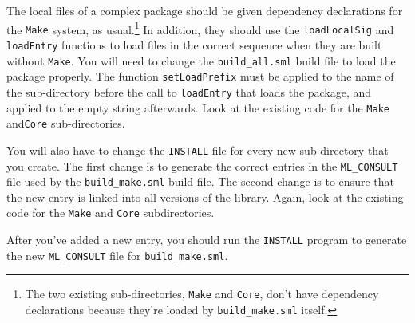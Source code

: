 The local files of a complex package should be given dependency declarations
for the {\tt Make} system, as usual.\footnote{The two existing sub-directories,
{\tt Make} and {\tt Core}, don't have dependency declarations because
they're loaded by {\tt build\_make.sml} itself.}
In addition, they should use the
{\tt loadLocalSig} and {\tt loadEntry} functions to load files in the correct
sequence when they are built without {\tt Make}.  You will need to change
the {\tt build\_all.sml}
build file to load the package properly.  The function {\tt setLoadPrefix}
must be applied to the name of the sub-directory before the call to
{\tt loadEntry} that loads the package, and applied to the empty string
afterwards.  Look at the existing code for the {\tt Make} and{\tt Core}
sub-directories.

You will also have to change the {\small\tt INSTALL} file for every
new sub-directory that you create.  The first change is to generate
the correct entries in the {\small\tt ML\_CONSULT} file used by the
{\tt build\_make.sml} build file.  The second change is to ensure that
the new entry is linked into all versions of the library.  Again, look at
the existing code for the {\tt Make} and {\tt Core} subdirectories.

After you've added a new entry, you should run the {\small\tt INSTALL}
program to generate the new {\small\tt ML\_CONSULT} file for
{\tt build\_make.sml}.

